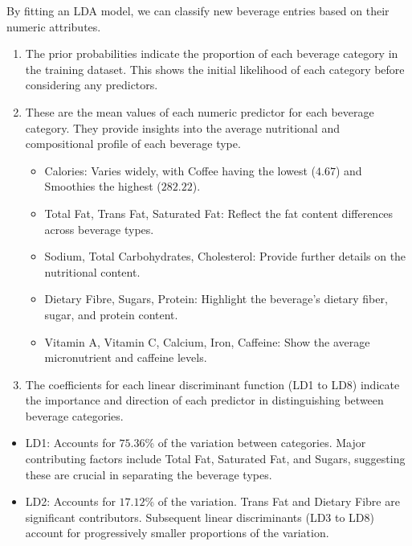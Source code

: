 \documentclass[
]{article}
\begin{document}
By fitting an LDA model, we can classify new beverage entries based on
their numeric attributes.

\begin{enumerate}
\def\labelenumi{\arabic{enumi}.}
\item
  The prior probabilities indicate the proportion of each beverage
  category in the training dataset. This shows the initial likelihood of
  each category before considering any predictors.
\item
  These are the mean values of each numeric predictor for each beverage
  category. They provide insights into the average nutritional and
  compositional profile of each beverage type.

  \begin{itemize}
  \item
    Calories: Varies widely, with Coffee having the lowest (\(4.67\))
    and Smoothies the highest (\(282.22\)).
  \item
    Total Fat, Trans Fat, Saturated Fat: Reflect the fat content
    differences across beverage types.
  \item
    Sodium, Total Carbohydrates, Cholesterol: Provide further details on
    the nutritional content.
  \item
    Dietary Fibre, Sugars, Protein: Highlight the beverage's dietary
    fiber, sugar, and protein content.
  \item
    Vitamin A, Vitamin C, Calcium, Iron, Caffeine: Show the average
    micronutrient and caffeine levels.
  \end{itemize}
\item
  The coefficients for each linear discriminant function (LD1 to LD8)
  indicate the importance and direction of each predictor in
  distinguishing between beverage categories.
\end{enumerate}

\begin{itemize}
\item
  LD1: Accounts for \(75.36\)\% of the variation between categories.
  Major contributing factors include Total Fat, Saturated Fat, and
  Sugars, suggesting these are crucial in separating the beverage types.
\item
  LD2: Accounts for \(17.12\)\% of the variation. Trans Fat and Dietary
  Fibre are significant contributors. Subsequent linear discriminants
  (LD3 to LD8) account for progressively smaller proportions of the
  variation.
\end{itemize}
\end{document}
